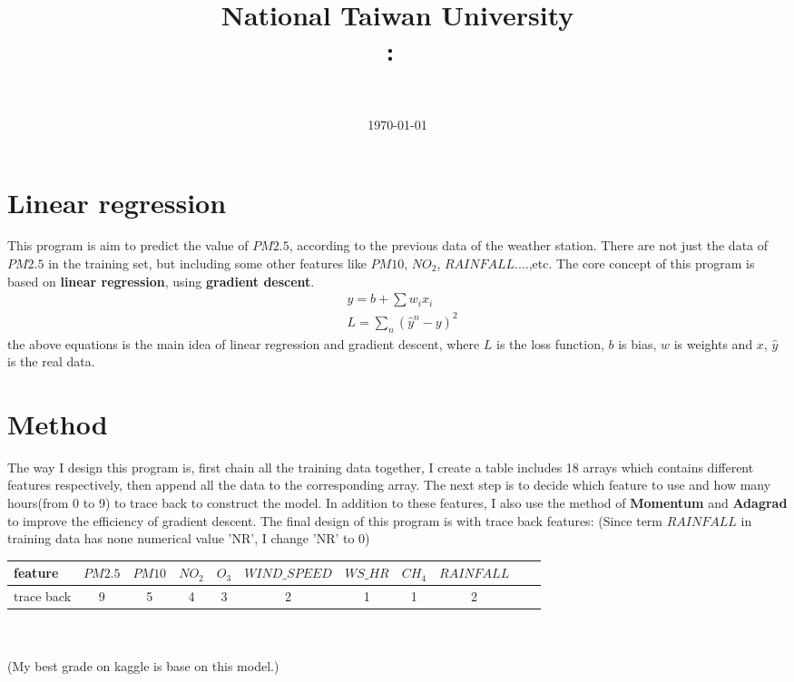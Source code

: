 \documentclass[11pt]{article}
\title{
{National Taiwan University}\\    
    \textmd{\textbf{\Class:\ \Title}}
}
\author{
	\Department \ \AuthorID \\
	\textbf{\AuthorName}
}
\date{
	\today \\
	\horline{1pt}
}
\newcommand\n{\mbox{\qquad}}
\begin{document}
\maketitle

\section{Linear regression}
\n This program is aim to predict the value of $PM2.5$, according to the previous data of the weather station. There are not just the data of $PM2.5$ in the training set, but including some other features like $PM10$, $NO_2$, $RAINFALL$....,etc. The core concept of this program is based on \textbf{linear regression}, using \textbf{gradient descent}.
\begin{align*}
	&y = b + \sum w_i x_i \\
	&L = \sum_n (\widehat{y}^n - y)^2 
\end{align*}
the above equations is the main idea of linear regression and gradient descent, where $L$ is the loss function, $b$ is bias, $w$ is weights and $x$, $\widehat{y}$ is the real data.

\section{Method}
\n The way I design this program is, first chain all the training data together, I create a table includes 18 arrays which contains different features respectively, then append all the data to the corresponding array. The next step is to decide which feature to use and how many hours(from 0 to 9) to trace back to construct the model. In addition to these features, I also use the method of \textbf{Momentum} and \textbf{Adagrad} to improve the efficiency of gradient descent. The final design of this program is with trace back features: (Since term $RAINFALL$ in training data has none numerical value 'NR', I change 'NR' to 0)\\
\begin{tabular}[t]{|l|c|c|c|c|c|c|c|c|c|c|}
	\hline
	feature & $PM2.5$ & $PM10$ & $NO_2$ & $O_3$ & $WIND\_SPEED$ & $WS\_HR$ & $CH_4$ & 	$RAINFALL$\\
	\hline 
	trace back & 9 & 5 & 4 & 3 & 2 & 1 & 1 & 2\\
	\hline
\end{tabular} 
\\ \\ 
\n (My best grade on kaggle is base on this model.)
\end{document}
